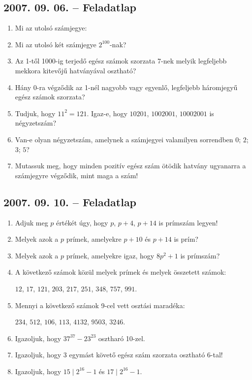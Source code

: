 \subsection*{2007. 09. 06. -- Feladatlap}
\begin{enumerate}
\item Mi az utolsó számjegye:
\item Mi az utolsó két számjegye $2^{100}$-nak?
\item Az 1-től 1000-ig terjedő egész számok szorzata 7-nek melyik legfeljebb mekkora kitevőjű hatványával osztható?
\item Hány 0-ra végződik az 1-nél nagyobb vagy egyenlő, legfeljebb háromjegyű egész számok szorzata?
\item Tudjuk, hogy $11^2=121$. Igaz-e, hogy $10201$, $1002001$, $10002001$ is négyzetszám?
\item Van-e olyan négyzetszám, amelynek a számjegyei valamilyen sorrendben $0$; $2$; $3$; $5$?
\item Mutassuk meg, hogy minden pozitív egész szám ötödik hatvány ugyanarra a számjegyre végződik, mint maga a szám!
\end{enumerate}


\subsection*{2007. 09. 10. -- Feladatlap}
\begin{enumerate}
\item Adjuk meg $p$ értékét úgy, hogy $p$, $p+4$, $p+14$ is prímszám legyen! 
\item Melyek azok a $p$ prímek, amelyekre $p+10$ és $p+14$ is prím?
\item Melyek azok a $p$ prímek, amelyekre igaz, hogy $8p^2+1$ is prímszám?
\item A következő számok közül melyek prímek és melyek összetett számok:

$12$, $17$, $121$, $203$, $217$, $251$, $348$, $757$, $991$.
\item Mennyi a következő számok 9-cel vett osztási maradéka:

$234$, $512$, $106$, $113$, $4132$, $9503$, $3246$.
\item Igazoljuk, hogy $37^{37}-23^{23}$ osztharó 10-zel.
\item Igazoljuk, hogy 3 egymást követő egész szám szorzata osztható 6-tal!
\item Igazoljuk, hogy $15 \mid 2^{16}-1$ és $17 \mid 2^{16}-1$.
\end{enumerate}


